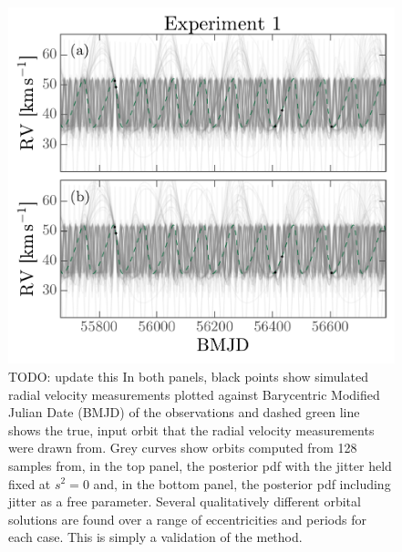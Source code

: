 \documentclass[manuscript, letterpaper]{aastex6}
\newcommand{\todo}[1]{{\color{red}TODO: #1}}
\begin{document}
\begin{figure}[p]
\begin{center}
\includegraphics[width=\textwidth]{figures/validation-rv-curves.pdf}
\end{center}
\caption{%
\todo{update this}
In both panels, black points show simulated radial velocity measurements plotted
against Barycentric Modified Julian Date (BMJD) of the observations and dashed
green line shows the true, input orbit that the radial velocity measurements
were drawn from.
Grey curves show orbits computed from 128 samples from, in the top panel, the
posterior pdf with the jitter held fixed at $s^2 = 0$ and, in the bottom panel,
the posterior pdf including jitter as a free parameter.
Several qualitatively different orbital solutions are found over a range of
eccentricities and periods for each case.
This is simply a validation of the method.
\label{fig:validation-rv}}
\end{figure}
\end{document}
